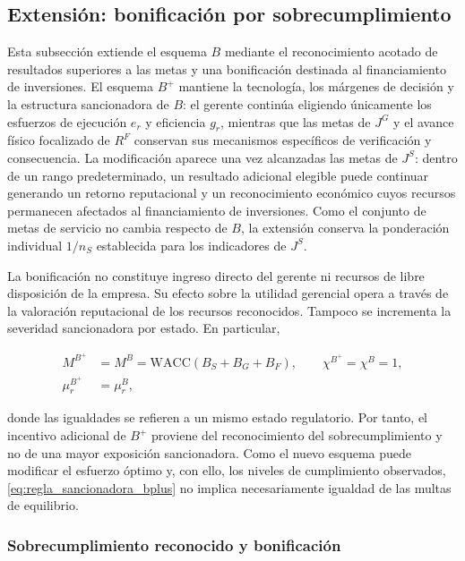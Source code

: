 \subsection{Extensión: bonificación por sobrecumplimiento}

Esta subsección extiende el esquema \(B\) mediante el reconocimiento acotado de resultados superiores a las metas y una bonificación destinada al financiamiento de inversiones. El esquema \(B^{+}\) mantiene la tecnología, los márgenes de decisión y la estructura sancionadora de \(B\): el gerente continúa eligiendo únicamente los esfuerzos de ejecución \(e_r\) y eficiencia \(g_r\), mientras que las metas de \(J^{G}\) y el avance físico focalizado de \(R^{F}\) conservan sus mecanismos específicos de verificación y consecuencia. La modificación aparece una vez alcanzadas las metas de \(J^{S}\): dentro de un rango predeterminado, un resultado adicional elegible puede continuar generando un retorno reputacional y un reconocimiento económico cuyos recursos permanecen afectados al financiamiento de inversiones. Como el conjunto de metas de servicio no cambia respecto de \(B\), la extensión conserva la ponderación individual \(1/n_S\) establecida para los indicadores de \(J^{S}\).

La bonificación no constituye ingreso directo del gerente ni recursos de libre disposición de la empresa. Su efecto sobre la utilidad gerencial opera a través de la valoración reputacional de los recursos reconocidos. Tampoco se incrementa la severidad sancionadora por estado. En particular,

\begin{subequations}
\label{eq:regla_sancionadora_bplus}
\begin{align}
M^{B^{+}}
&=
M^{B}
=
\mathrm{WACC}
\left(
B_S+B_G+B_F
\right),
\qquad
\chi^{B^{+}}=\chi^{B}=1,
\label{eq:multa_bplus}
\\
\mu_r^{B^{+}}
&=
\mu_r^{B},
\label{eq:exposicion_bplus}
\end{align}
\end{subequations}

donde las igualdades se refieren a un mismo estado regulatorio. Por tanto, el incentivo adicional de \(B^{+}\) proviene del reconocimiento del sobrecumplimiento y no de una mayor exposición sancionadora. Como el nuevo esquema puede modificar el esfuerzo óptimo y, con ello, los niveles de cumplimiento observados, \eqref{eq:regla_sancionadora_bplus} no implica necesariamente igualdad de las multas de equilibrio.

\subsubsection{Sobrecumplimiento reconocido y bonificación}


